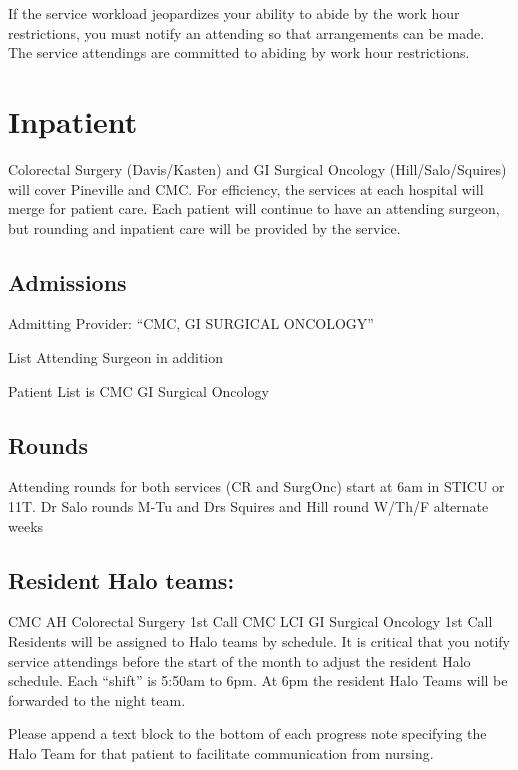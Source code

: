\documentclass[
]{book}
\begin{document}
If the service workload jeopardizes your ability to abide by the work hour restrictions, you must notify an attending so that arrangements can be made. The service attendings are committed to abiding by work hour restrictions.

\hypertarget{inpatient}{%
\chapter{Inpatient}\label{inpatient}}

Colorectal Surgery (Davis/Kasten) and GI Surgical Oncology (Hill/Salo/Squires) will cover Pineville and CMC. For efficiency, the services at each hospital will merge for patient care. Each patient will continue to have an attending surgeon, but rounding and inpatient care will be provided by the service.

\hypertarget{admissions}{%
\section{Admissions}\label{admissions}}

Admitting Provider: ``CMC, GI SURGICAL ONCOLOGY''

List Attending Surgeon in addition

Patient List is CMC GI Surgical Oncology

\hypertarget{rounds}{%
\section{Rounds}\label{rounds}}

Attending rounds for both services (CR and SurgOnc) start at 6am in STICU or 11T. Dr Salo rounds M-Tu and Drs Squires and Hill round W/Th/F alternate weeks

\hypertarget{resident-halo-teams}{%
\section{Resident Halo teams:}\label{resident-halo-teams}}

CMC AH Colorectal Surgery 1st Call
CMC LCI GI Surgical Oncology 1st Call
Residents will be assigned to Halo teams by schedule. It is critical that you notify service attendings before the start of the month to adjust the resident Halo schedule. Each ``shift'' is 5:50am to 6pm. At 6pm the resident Halo Teams will be forwarded to the night team.

Please append a text block to the bottom of each progress note specifying the Halo Team for that patient to facilitate communication from nursing.
\end{document}

